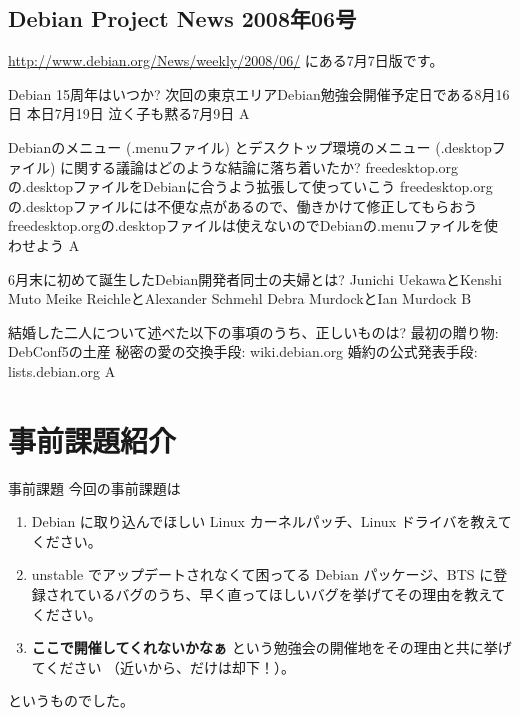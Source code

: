 \documentclass[cjk,dvipdfmx,12pt]{beamer}
\begin{document}
 \subsection{Debian Project News 2008年06号}
 \url{http://www.debian.org/News/weekly/2008/06/}
 にある7月7日版です。
 
 \santaku
 {Debian 15周年はいつか?}
 {次回の東京エリアDebian勉強会開催予定日である8月16日}
 {本日7月19日}
 {泣く子も黙る7月9日}
 {A}
 
 \santaku
 {Debianのメニュー (.menuファイル) とデスクトップ環境のメニュー (.desktopファイル) に関する議論はどのような結論に落ち着いたか?}
 {freedesktop.orgの.desktopファイルをDebianに合うよう拡張して使っていこう}
 {freedesktop.orgの.desktopファイルには不便な点があるので、働きかけて修正してもらおう}
 {freedesktop.orgの.desktopファイルは使えないのでDebianの.menuファイルを使わせよう}
 {A}%
 
 \santaku
 {6月末に初めて誕生したDebian開発者同士の夫婦とは?}
 {Junichi UekawaとKenshi Muto}
 {Meike ReichleとAlexander Schmehl}
 {Debra MurdockとIan Murdock}%
 {B}
 
 \santaku
 {結婚した二人について述べた以下の事項のうち、正しいものは?}
 {最初の贈り物: DebConf5の土産}%
 {秘密の愛の交換手段: wiki.debian.org}%
 {婚約の公式発表手段: lists.debian.org}%
 {A}


\section{事前課題紹介}

\begin{frame}{事前課題}
今回の事前課題は
\begin{enumerate}
 \item Debian に取り込んでほしい Linux カーネルパッチ、Linux ドライバを教えてください。
 \item unstable でアップデートされなくて困ってる Debian パッケージ、BTS に登録されているバグのうち、早く直ってほしいバグを挙げてその理由を教えてください。
 \item {\bf ここで開催してくれないかなぁ} という勉強会の開催地をその理由と共に挙げてください （近いから、だけは却下！）。
\end{enumerate}
というものでした。
\end{frame}
\end{document}
